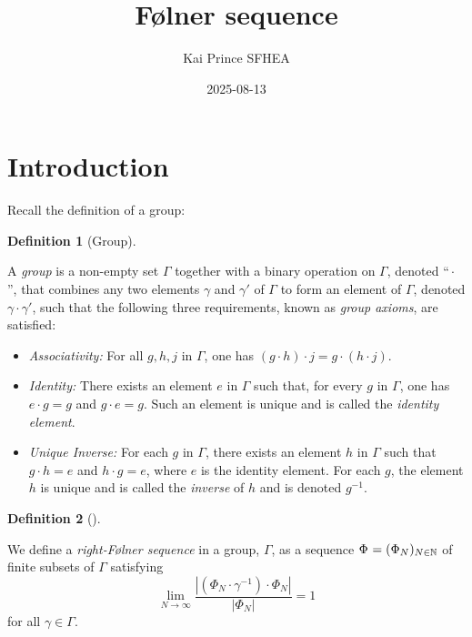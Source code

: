 \documentclass[
  british,
]{article}
\title{Følner sequence}
\author{Kai Prince SFHEA}
\date{2025-08-13}
\providecommand{\tightlist}{%
  \setlength{\itemsep}{0pt}\setlength{\parskip}{0pt}}
\theoremstyle{definition}
\newtheorem{definition}{Definition}[section]
\theoremstyle{plain}
\theoremstyle{remark}
\newcommand{\GroupOperation}[2]{{#1}\cdot{#2}}
\newcommand{\Identity}{{e}}
\newcommand{\Folner}[1][\vphantom{}]{{\Phi}_{#1}}
\newcommand{\GroupElement}{{\gamma}}
\newcommand{\Group}{{\Gamma}}
\newcommand{\Inverse}[1]{{#1}^{-1}}
\begin{document}
\maketitle


\section{Introduction}\label{introduction}

Recall the definition of a group:

\begin{definition}[Group]\protect\hypertarget{def-group-recall}{}\label{def-group-recall}

A \emph{group} is a non-empty set \(\Group\) together with a binary
operation on \(\Group\), denoted ``\(\GroupOperation{}{}\)'', that
combines any two elements \(\GroupElement\) and \(\GroupElement'\) of
\(\Group\) to form an element of \(\Group\), denoted
\(\GroupOperation{\GroupElement}{\GroupElement'}\), such that the
following three requirements, known as \emph{group axioms}, are
satisfied:

\begin{itemize}
\tightlist
\item
  \emph{Associativity:} For all \({g},{h},{j}\) in \(\Group\), one has
  \(\GroupOperation{(\GroupOperation{g}{h})}{j}=\GroupOperation{g}{(\GroupOperation{h}{j})}\).
\item
  \emph{Identity:} There exists an element \(\Identity\) in \(\Group\)
  such that, for every \({g}\) in \(\Group\), one has
  \(\GroupOperation{\Identity}{g}={g}\) and
  \(\GroupOperation{g}{\Identity}={g}\). Such an element is unique and
  is called the \emph{identity element}.
\item
  \emph{Unique Inverse:} For each \({g}\) in \(\Group\), there exists an
  element \({h}\) in \(\Group\) such that
  \(\GroupOperation{g}{h}=\Identity\) and
  \(\GroupOperation{h}{g}=\Identity\), where \(\Identity\) is the
  identity element. For each \({g}\), the element \({h}\) is unique and
  is called the \emph{inverse} of \({h}\) and is denoted
  \(\Inverse{g}\).
\end{itemize}

\end{definition}

\begin{definition}[]\protect\hypertarget{def-rightFolner}{}\label{def-rightFolner}

We define a \emph{right-Følner sequence} in a group, \(\Group\), as a
sequence \(\Folner =(\Folner[N])_{N\in\mathbb{N}}\) of finite subsets of
\(\Gamma\) satisfying
\[\lim_{N\rightarrow\infty}\frac{|\GroupOperation{(\GroupOperation{\Folner[N]}{\Inverse{\GroupElement}})}{\Folner[N]}|}{|\Folner[N]|}=1\]for
all \(\GroupElement\in\Group\).

\end{definition}
\end{document}
